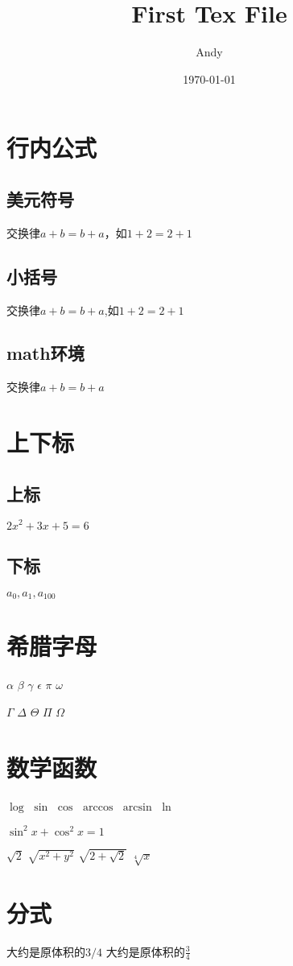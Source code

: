 \documentclass{article}
\title{First Tex File}
\author{Andy}
\date{\today}
\begin{document}
	\maketitle%
	
	\section{行内公式}
	\subsection{美元符号}
	交换律$a+b=b+a$，如$1+2=2+1$
	\subsection{小括号}
	交换律\(a+b=b+a\),如\(1+2=2+1\)
	\subsection{math环境}
	交换律\begin{math}
		a+b=b+a
	\end{math}
	\section{上下标}
	\subsection{上标}
	$2x^2+3x+5=6$
	\subsection{下标}
	$a_0,a_1,a_{100}$
	\section{希腊字母}
	$\alpha$
	$\beta$
	$\gamma$
	$\epsilon$
	$\pi$
	$\omega$
	
	$\Gamma$
	$\Delta$
	$\Theta$
	$\Pi$
	$\Omega$
	\section{数学函数}
	$\log$
	$\sin$
	$\cos$
	$\arccos$
	$\arcsin$
	$\ln$
	
	$\sin^2x+\cos^2x=1$
	
	$\sqrt{2}$
	$\sqrt{x^2+y^2}$
	$\sqrt{2+\sqrt{2}}$
	$\sqrt[4]{x}$
	\section{分式}
	大约是原体积的$3/4$
	大约是原体积的$\frac{3}{4}$
\end{document}
